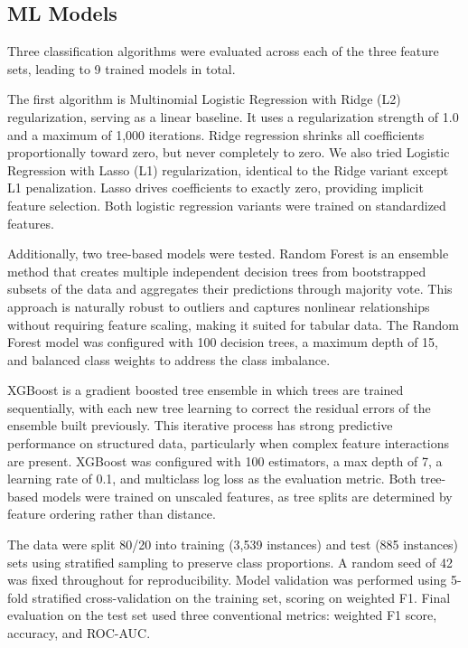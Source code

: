 \documentclass[11pt]{article}
\begin{document}
\subsection{ML Models}

Three classification algorithms were evaluated across each of the three feature sets, leading to 9 trained models in total. 

The first algorithm is Multinomial Logistic Regression with Ridge (L2) regularization, serving as a linear baseline. It uses a regularization strength of 1.0 and a maximum of 1,000 iterations. Ridge regression shrinks all coefficients proportionally toward zero, but never completely to zero. We also tried Logistic Regression with Lasso (L1) regularization, identical to the Ridge variant except L1 penalization. Lasso drives coefficients to exactly zero, providing implicit feature selection. Both logistic regression variants were trained on standardized features.

Additionally, two tree-based models were tested. Random Forest is an ensemble method that creates multiple independent decision trees from bootstrapped subsets of the data and aggregates their predictions through majority vote. This approach is naturally robust to outliers and captures nonlinear relationships without requiring feature scaling, making it suited for tabular data. The Random Forest model was configured with 100 decision trees, a maximum depth of 15, and balanced class weights to address the class imbalance. 

XGBoost is a gradient boosted tree ensemble in which trees are trained sequentially, with each new tree learning to correct the residual errors of the ensemble built previously. This iterative process has strong predictive performance on structured data, particularly when complex feature interactions are present. XGBoost was configured with 100 estimators, a max depth of 7, a learning rate of 0.1, and multiclass log loss as the evaluation metric. Both tree-based models were trained on unscaled features, as tree splits are determined by feature ordering rather than distance.

The data were split 80/20 into training (3,539 instances) and test (885 instances) sets using stratified sampling to preserve class proportions. A random seed of 42 was fixed throughout for reproducibility. Model validation was performed using 5-fold stratified cross-validation on the training set, scoring on weighted F1. Final evaluation on the test set used three conventional metrics: weighted F1 score, accuracy, and ROC-AUC.
\end{document}
